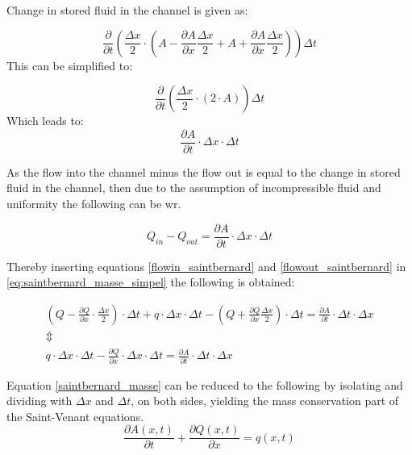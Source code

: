 Change in stored fluid in the channel is given as:

\begin{equation}\label{stored_saintbernard}
\frac{\partial}{\partial t} \left(\frac{\Delta x}{2} \cdot \left(A- \frac{\partial A}{\partial x} \frac{\Delta x}{2} +A + \frac{\partial A}{\partial x} \frac{\Delta x}{2}	\right) \right) \Delta t
\end{equation}
This can be simplified to:

\begin{equation}
	\frac{\partial}{\partial t} \left(\frac{\Delta x}{2} \cdot \left(2\cdot A	\right) \right) \Delta t
\end{equation}
Which leads to:
\begin{equation}\label{stored_saintbernardv2}
	\frac{\partial A}{\partial t} \cdot \Delta x	\cdot \Delta t
\end{equation}

As the flow into the channel minus the flow out is equal to the change in stored fluid in the channel, then due to the assumption of incompressible fluid and uniformity the following can be wr.  

\begin{equation}\label{eq:saintbernard_masse_simpel}
	Q_{in} - Q_{out} = \frac{\partial A}{\partial t} \cdot \Delta x	\cdot \Delta t
\end{equation}

Thereby inserting equations \ref{flowin_saintbernard} and \ref{flowout_saintbernard} in \ref{eq:saintbernard_masse_simpel} the following is obtained:

\begin{equation}
\begin{array}{l}
	\left(Q - \frac{\partial Q}{\partial x}\cdot \frac{\Delta x}{2}\right) \cdot \Delta t + q \cdot \Delta x \cdot \Delta t - \left(Q + \frac{\partial Q}{ \partial x} \frac{\Delta x}{2} \right) \cdot \Delta t  = \frac{\partial A}{\partial t}\cdot \Delta t 
	\cdot \Delta x \\ 
\Updownarrow \\
q \cdot \Delta x \cdot \Delta t  - \frac{\partial Q}{\partial x} \cdot \Delta x \cdot \Delta t  = \frac{\partial A}{\partial t} \cdot \Delta t 
	\cdot \Delta x 
\end{array}
\label{saintbernard_masse}
\end{equation}

Equation \ref{saintbernard_masse} can be reduced to the following by isolating and dividing with $\Delta x$ and $\Delta t$, on both sides, yielding the mass conservation part of the Saint-Venant equations.
\begin{equation}	
\frac{\partial A(x,t)}{\partial t} + \frac{\partial Q(x,t)}{\partial x}=q(x,t)
\label{saintbernard_mass_lateral}
\end{equation}


